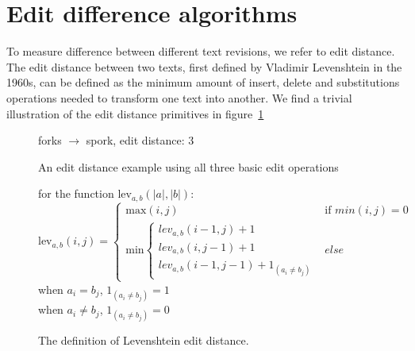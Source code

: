 \section{Edit difference algorithms}
To measure difference between different text revisions, we refer to
edit distance. The edit distance between two texts, first defined by
Vladimir Levenshtein in the 1960s,\cite{Levenshtein1966} can be
defined as the minimum amount of insert, delete and substitutions
operations needed to transform one text into another. We find a
trivial illustration of the edit distance primitives in
figure~\ref{fig:fork-spork}

\begin{figure}
  \centering
  

  \vspace{3 mm}

  forks $\rightarrow$ spork, edit distance: 3
  
  \caption{An edit distance example using all three basic edit
    operations}
  \label{fig:fork-spork}
\end{figure}

\begin{figure}
  \centering
  for the function $\mbox{lev}_{a,b}(|a|,|b|)$:\\
  $$\mbox{lev}_{a,b}(i,j) = 
  \left\{
  \begin{array}{ll}
    \mbox{max}(i,j) & \mbox{if }min(i,j) = 0\\
    \mbox{min}\left\{
    \begin{array}{lll}
      lev_{a,b}(i-1,j)+1\\
      lev_{a,b}(i,j-1)+1\\
      lev_{a,b}(i-1,j-1)+1_{(a_i{\neq}b_j)}
    \end{array}
    \right.
    & else 
  \end{array}
  \right.$$
  when $a_i = b_j$, $1_{(a_i{\neq}b_j)} = 1$\\
  when  $a_i \neq b_j$, $1_{(a_i{\neq}b_j)} = 0$
  \caption{The definition of Levenshtein edit distance.}
  \label{fig:levdef}
\end{figure}

